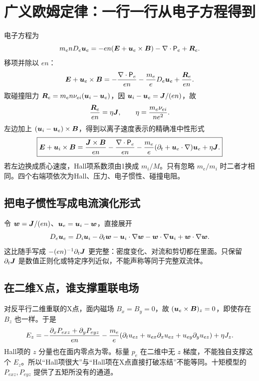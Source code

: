

\section{广义欧姆定律：一行一行从电子方程得到}
电子方程为
\begin{equation}m_enD_e\bm{u}_e=-en(\bm{E}+\bm{u}_e\times\bm{B})-\nabla\cdot\mathsf P_e+\bm{R}_e.
\end{equation}
移项并除以 $en$：
\begin{equation}\bm{E}+\bm{u}_e\times\bm{B}=-{\nabla\cdot\mathsf P_e\over en}-{m_e\over e}D_e\bm{u}_e+{\bm{R}_e\over en}.\label{eq:electronohm}\end{equation}
取碰撞阻力 $\bm{R}_e=m_en\nu_{ei}(\bm{u}_i-\bm{u}_e)$，因 $\bm{u}_i-\bm{u}_e=\bm{J}/(en)$，故
\begin{equation}{\bm{R}_e\over en}=\eta\bm{J},\qquad \eta={m_e\nu_{ei}\over ne^2}.
\end{equation}
左边加上 $(\bm{u}_i-\bm{u}_e)\times\bm{B}$，得到以离子速度表示的精确准中性形式
\begin{equation}
\boxed{\bm{E}+\bm{u}_i\times\bm{B}={\bm{J}\times\bm{B}\over en}-{\nabla\cdot\mathsf P_e\over en}
-{m_e\over e}(\partial_t+\bm{u}_e\cdot\nabla)\bm{u}_e+\eta\bm{J}.}\label{eq:gohm}
\end{equation}
若左边换成质心速度，Hall项系数须由1换成 $m_i/M$。只有忽略 $m_e/m_i$ 时二者才相同。四个右端项依次为Hall、压力、电子惯性、碰撞电阻。

\subsection{把电子惯性写成电流演化形式}
令 $\bm{w}=\bm{J}/(en)$、$\bm{u}_e=\bm{u}_i-\bm{w}$，直接展开
\begin{equation}
D_e\bm{u}_e=D_i\bm{u}_i-\partial_t\bm{w}-\bm{u}_i\cdot\nabla\bm{w}-\bm{w}\cdot\nabla\bm{u}_i+\bm{w}\cdot\nabla\bm{w}.\label{eq:inertiaexpanded}
\end{equation}
这比随手写成 $-(en)^{-1}\partial_t\bm{J}$ 更完整：密度变化、对流和剪切都在里面。只保留 $\partial_t\bm{J}$ 是数值正则化或特定序列近似，不能声称等同于完整双流体。

\subsection{在二维X点，谁支撑重联电场}
对反平行二维重联的X点，面内磁场 $B_x=B_y=0$，故 $(\bm{u}_e\times\bm{B})_z=0$，即使存在 $B_z$ 也一样。于是
\begin{equation}
E_z=-{\partial_xP_{exz}+\partial_yP_{eyz}\over en}
-{m_e\over e}(\partial_tu_{ez}+u_{ex}\partial_xu_{ez}+u_{ey}\partial_yu_{ez})+\eta J_z.\label{eq:xpoint}
\end{equation}
Hall项的 $z$ 分量也在面内零点为零。标量 $p_e$ 在二维中无 $z$ 梯度，不能独自支撑这个 $E_z$。所以“Hall项很大”与“Hall项在X点直接打破冻结”不能等同。十矩模型的 $P_{exz},P_{eyz}$ 提供了五矩所没有的通道。\citep{Wang2015}

